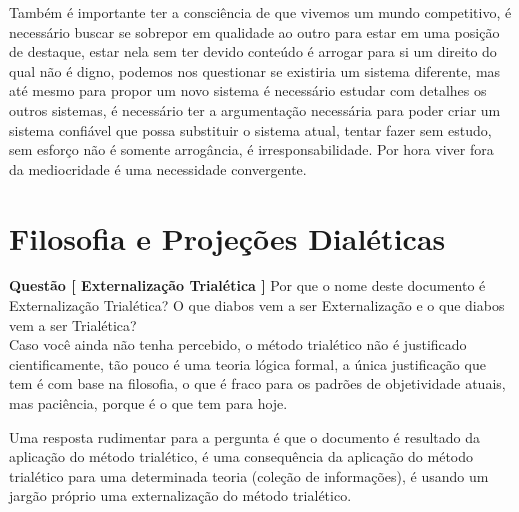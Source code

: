 Também é importante ter a consciência de que vivemos um mundo competitivo, é necessário buscar se sobrepor em qualidade ao outro para estar em uma posição de destaque, estar nela sem ter devido conteúdo é arrogar para si um direito do qual não é digno, podemos nos questionar se existiria um sistema diferente, mas até mesmo para propor um novo sistema é necessário estudar com detalhes os outros sistemas, é necessário ter a argumentação necessária para poder criar um sistema confiável que possa substituir o sistema atual, tentar fazer sem estudo, sem esforço não é somente arrogância, é irresponsabilidade. Por hora viver fora da mediocridade é uma necessidade convergente.



\section{Filosofia e Projeções Dialéticas}

\hspace{\baselineskip}

\textbf{Questão [ Externalização Trialética ]} Por que o nome deste documento é Externalização Trialética? O que diabos vem a ser Externalização e o que diabos vem a ser Trialética?\\

Caso você ainda não tenha percebido, o método trialético não é justificado cientificamente, tão pouco é uma teoria lógica formal, a única justificação que tem é com base na filosofia, o que é fraco para os padrões de objetividade atuais, mas paciência, porque é o que tem para hoje.

Uma resposta rudimentar para a pergunta é que o documento é resultado da aplicação do método trialético, é uma consequência da aplicação do método trialético para uma determinada teoria (coleção de informações), é usando um jargão próprio uma externalização do método trialético.

